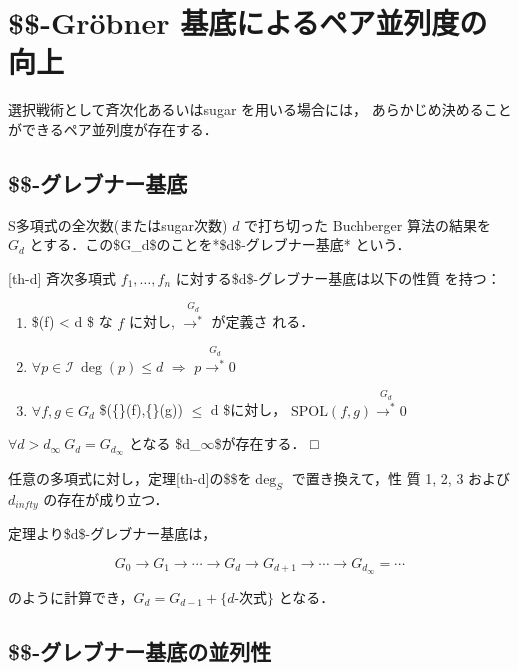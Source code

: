 \documentclass[a4j]{jarticle}
\begin{document}
{\section{\$\$-Gröbner 基底によるペア並列度の向上}
\label{sec:orgebd9c48}

選択戦術として斉次化あるいはsugar を用いる場合には，
あらかじめ決めることができるペア並列度が存在する．

\subsection{\$\$-グレブナー基底}
\label{sec:org8ba25ca}

S多項式の全次数(またはsugar次数) \(d\) で打ち切った Buchberger
算法の結果を \(G_d\) とする．この\$G\_d\$のことを*\$d\$-グレブナー基底*
という．

[th-d] 斉次多項式 \(f_1, \ldots, f_n\)
に対する\$d\$-グレブナー基底は以下の性質 を持つ：

\begin{enumerate}
\item \$\textdegree{}(f) < d \$ な \(f\) に対し,
\({{\!\stackrel{G_d}{\longrightarrow^{*}} }}\) が定義さ れる．

\item \(\forall p \in {\mathcal{I}} \ \deg(p) \le d\) \(\Rightarrow\)
\({{p\!\stackrel{G_d}{\longrightarrow^{*}} 0}}\)

\item \(\forall f, g \in G_d\)
\$\textdegree{}(\{\}(f),\{\}(g)) \(\le\) d \$に対し，
\({{{\mathrm{SPOL}}(f, g)\!\stackrel{G_d}{\longrightarrow^{*}} 0}}\)
\end{enumerate}

\(\forall d > d_\infty \ G_d = G_{d_\infty}\) となる
\$d\_\(\infty\)\$が存在する． □

任意の多項式に対し，定理[th-d]の\$\textdegree{}\$を\(\deg_S\) で置き換えて，性 質 1,
2, 3 および\(d_{infty}\) の存在が成り立つ．

定理より\$d\$-グレブナー基底は，

$$G_0 \rightarrow
G_1 \rightarrow
\cdots \rightarrow
G_{d} \rightarrow 
G_{d+1} \rightarrow 
\cdots \rightarrow
G_{d_\infty} = \cdots$$

のように計算でき，\(G_d = G_{d-1} + \{d\mbox{-次式}\}\) となる．

\subsection{\$\$-グレブナー基底の並列性}
\label{sec:org484f36f}

}
\end{document}

